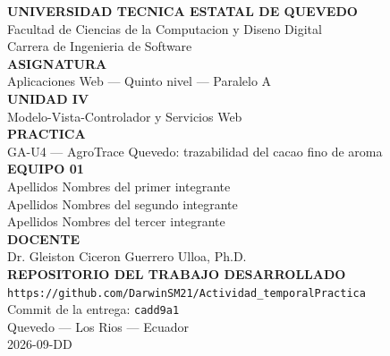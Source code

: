 \documentclass[11pt,a4paper]{article}
\newcommand{\numeroEquipo}{01}
\newcommand{\integranteUno}{Apellidos Nombres del primer integrante}
\newcommand{\integranteDos}{Apellidos Nombres del segundo integrante}
\newcommand{\integranteTres}{Apellidos Nombres del tercer integrante}
\newcommand{\fechaEntrega}{2026-09-DD}
\newcommand{\commitCorto}{cadd9a1}
\newcommand{\urlRepositorio}{https://github.com/DarwinSM21/Actividad_temporalPractica}
\begin{document}
\begin{center}

	\vspace*{0.8cm}

	{\Large\bfseries\textcolor{uteqverde}{UNIVERSIDAD TECNICA ESTATAL DE QUEVEDO}}\\[5pt]
	{\large Facultad de Ciencias de la Computacion y Diseno Digital}\\[3pt]
	{\large Carrera de Ingenieria de Software}\\[28pt]

	{\large\bfseries ASIGNATURA}\\[3pt]
	{\large Aplicaciones Web --- Quinto nivel --- Paralelo A}\\[20pt]

	{\large\bfseries UNIDAD IV}\\[3pt]
	{\large Modelo-Vista-Controlador y Servicios Web}\\[20pt]

	{\large\bfseries PRACTICA}\\[3pt]
	{\large GA-U4 --- AgroTrace Quevedo: trazabilidad del cacao fino de aroma}\\[28pt]

	{\large\bfseries EQUIPO \numeroEquipo}\\[8pt]
	{\large \integranteUno}\\[3pt]
	{\large \integranteDos}\\[3pt]
	{\large \integranteTres}\\[28pt]

	{\large\bfseries DOCENTE}\\[3pt]
	{\large Dr. Gleiston Ciceron Guerrero Ulloa, Ph.D.}\\[28pt]

	{\large\bfseries REPOSITORIO DEL TRABAJO DESARROLLADO}\\[10pt]

	{\normalsize\texttt{\urlRepositorio}}\\[14pt]

	{\normalsize Commit de la entrega: \texttt{\commitCorto}}\\[24pt]

	{\large Quevedo --- Los Rios --- Ecuador}\\[3pt]
	{\large \fechaEntrega}

	\vfill

\end{center}
\end{document}
